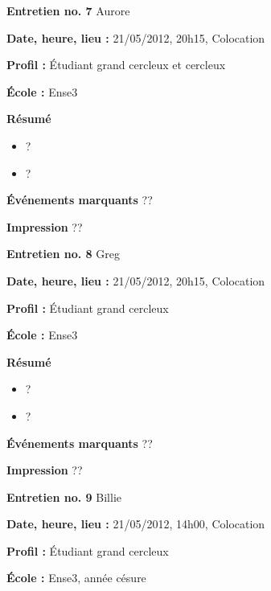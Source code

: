 \documentclass[a4paper, 11px]{article}
\begin{document}
 \textbf {\large Entretien no. 7}
Aurore

\textbf{Date, heure, lieu : }
21/05/2012, 20h15, Colocation

\textbf{Profil : }
Étudiant grand cercleux et cercleux


\textbf{École : }
Ense3

\textbf{Résumé}
	\begin{itemize}
		\item ?
		\item ?
	\end{itemize}

\textbf{Événements marquants}
??

\textbf{Impression}
??



\vspace{.3cm}

 \textbf {\large Entretien no. 8}
Greg

\textbf{Date, heure, lieu : }
21/05/2012, 20h15, Colocation

\textbf{Profil : }
Étudiant grand cercleux


\textbf{École : }
Ense3

\textbf{Résumé}
	\begin{itemize}
		\item ?
		\item ?
	\end{itemize}

\textbf{Événements marquants}
??

\textbf{Impression}
??



\vspace{.3cm}

 \textbf {\large Entretien no. 9}
Billie

\textbf{Date, heure, lieu : }
21/05/2012, 14h00, Colocation

\textbf{Profil : }
Étudiant grand cercleux

\textbf{École : }
Ense3, année césure
\end{document}
